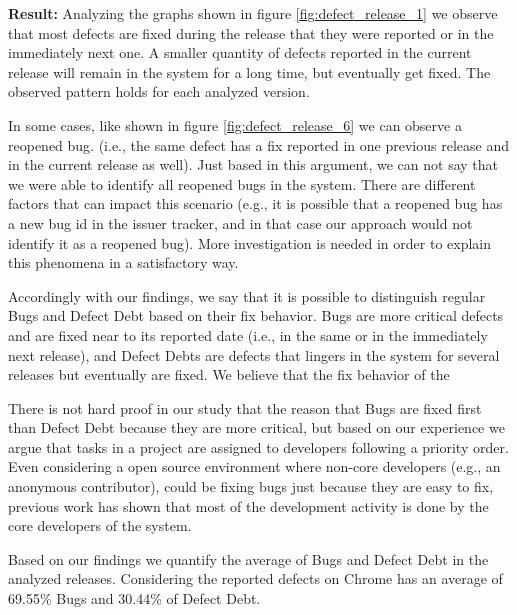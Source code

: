\vspace{1mm}
\noindent\textbf{Result:} Analyzing the graphs shown in figure \ref{fig:defect_release_1} we observe that most defects are fixed during the release that they were reported or in the immediately next one. A smaller quantity of defects reported in the current release will remain in the system for a long time, but eventually get fixed. The observed pattern holds for each analyzed version. 

In some cases, like shown in figure \ref{fig:defect_release_6} we can observe a reopened bug. (i.e., the same defect has a fix reported in one previous release and in the current release as well). Just based in this argument, we can not say that we were able to identify all reopened bugs in the system. There are different factors that can impact this scenario (e.g., it is possible that a reopened bug has a new bug id in the issuer tracker, and in that case our approach would not identify it as a reopened bug). More investigation is needed in order to explain this phenomena in a satisfactory way. 

Accordingly with our findings, we say that it is possible to distinguish regular Bugs and Defect Debt based on their fix behavior. Bugs are more critical defects and are fixed near to its reported date (i.e., in the same or in the immediately next release), and Defect Debts are defects that lingers in the system for several releases but eventually are fixed. We believe that the fix behavior of the 

There is not hard proof in our study that the reason that Bugs are fixed first than Defect Debt because they are more critical, but based on our experience we argue that tasks in a project are assigned to developers following a priority order. Even considering a open source environment where non-core developers (e.g., an anonymous contributor), could be fixing bugs just because they are easy to fix, previous work  has shown that most of the development activity is done by the core developers of the system.

Based on our findings we quantify the average of Bugs and Defect Debt in the analyzed releases. Considering the reported defects on Chrome has an average of 69.55\% Bugs and 30.44\% of Defect Debt.


